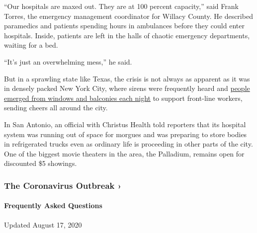 ``Our hospitals are maxed out. They are at 100 percent capacity,'' said
Frank Torres, the emergency management coordinator for Willacy County.
He described paramedics and patients spending hours in ambulances before
they could enter hospitals. Inside, patients are left in the halls of
chaotic emergency departments, waiting for a bed.

``It's just an overwhelming mess,'' he said.

But in a sprawling state like Texas, the crisis is not always as
apparent as it was in densely packed New York City, where sirens were
frequently heard and
\href{https://www.nytimes3xbfgragh.onion/interactive/2020/04/10/nyregion/nyc-7pm-cheer-thank-you-coronavirus.html}{people
emerged from windows and balconies each night} to support front-line
workers, sending cheers all around the city.

In San Antonio, an official with Christus Health told reporters that its
hospital system was running out of space for morgues and was preparing
to store bodies in refrigerated trucks even as ordinary life is
proceeding in other parts of the city. One of the biggest movie theaters
in the area, the Palladium, remains open for discounted \$5 showings.

\href{https://www.nytimes3xbfgragh.onion/news-event/coronavirus?action=click\&pgtype=Article\&state=default\&region=MAIN_CONTENT_3\&context=storylines_faq}{}

\hypertarget{the-coronavirus-outbreak-}{%
\subsubsection{The Coronavirus Outbreak
›}\label{the-coronavirus-outbreak-}}

\hypertarget{frequently-asked-questions}{%
\paragraph{Frequently Asked
Questions}\label{frequently-asked-questions}}

Updated August 17, 2020

